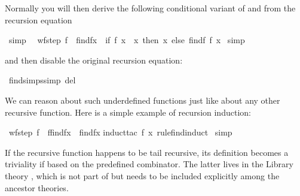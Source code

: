 \begin{isabellebody}
\begin{isamarkuptext}
Normally you will then derive the following conditional variant of and from
the recursion equation%
\end{isamarkuptext}%
\ {\isacharbrackleft}simp{\isacharbrackright}{\isacharcolon}\isanewline
\ \ {\isachardoublequote}wf{\isacharparenleft}step{}\ f{\isacharparenright}\ {\isasymLongrightarrow}\ find{\isacharparenleft}f{\isacharcomma}x{\isacharparenright}\ {\isacharequal}\ {\isacharparenleft}if\ f\ x\ {\isacharequal}\ x\ then\ x\ else\ find{\isacharparenleft}f{\isacharcomma}\ f\ x{\isacharparenright}{\isacharparenright}{\isachardoublequote}\isanewline
{}\ simp%
\begin{isamarkuptext}%
\noindent and then disable the original recursion equation:%
\end{isamarkuptext}%
\ find{\isachardot}simps{\isacharbrackleft}simp\ del{\isacharbrackright}%
\begin{isamarkuptext}%
We can reason about such underdefined functions just like about any other
recursive function. Here is a simple example of recursion induction:%
\end{isamarkuptext}%
\ {\isachardoublequote}wf{\isacharparenleft}step{}\ f{\isacharparenright}\ {\isasymlongrightarrow}\ f{\isacharparenleft}find{\isacharparenleft}f{\isacharcomma}x{\isacharparenright}{\isacharparenright}\ {\isacharequal}\ find{\isacharparenleft}f{\isacharcomma}x{\isacharparenright}{\isachardoublequote}\isanewline
{}induct{\isacharunderscore}tac\ f\ x\ rule{\isacharcolon}find{\isachardot}induct{\isacharparenright}\isanewline
{}\ simp\isanewline
{}%
%
\begin{isamarkuptext}%
If the recursive function happens to be tail recursive, its
definition becomes a triviality if based on the predefined 
combinator.  The latter lives in the Library theory
, which is not part of  but needs to
be included explicitly among the ancestor theories.


\end{isamarkuptext}
\end{isabellebody}
